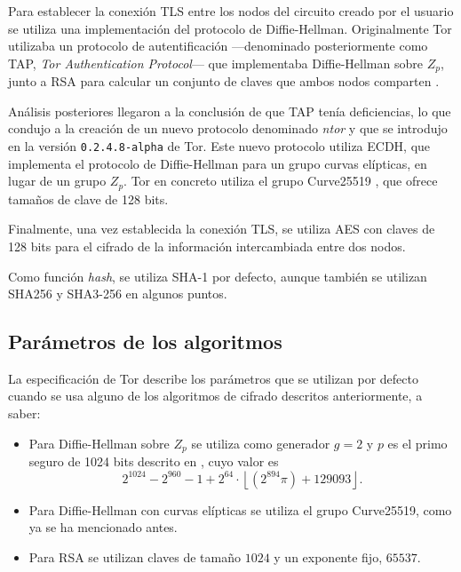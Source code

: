 \documentclass[
  a4paper,
  12pt,
  spanish,
]{scrartcl}
\begin{document}
Para establecer la conexión TLS entre los nodos del circuito creado por el usuario se utiliza una implementación del protocolo de Diffie-Hellman.
Originalmente Tor utilizaba un protocolo de autentificación ---denominado posteriormente como TAP, \textit{Tor Authentication Protocol}--- que implementaba Diffie-Hellman sobre \(Z_p\), junto a RSA para calcular un conjunto de claves que ambos nodos comparten \parencite{dingledine_tor:_2004}.

Análisis posteriores \parencite{hutchison_security_2006} llegaron a la conclusión de que TAP tenía deficiencias, lo que condujo a la creación de un nuevo protocolo denominado \textit{ntor} y que se introdujo en la versión \texttt{0.2.4.8-alpha} de Tor.
Este nuevo protocolo utiliza ECDH, que implementa el protocolo  de Diffie-Hellman para un grupo curvas elípticas, en lugar de un grupo \(Z_p\). Tor en concreto utiliza el grupo Curve25519 \parencite{yung_curve25519:_2006}, que ofrece tamaños de clave de 128 bits.

Finalmente, una vez establecida la conexión TLS, se utiliza AES con claves de 128 bits para el cifrado de la información intercambiada entre dos nodos.

Como función \textit{hash}, se utiliza SHA-1 por defecto, aunque también se utilizan SHA256 y SHA3-256 en algunos puntos.

\subsection{Parámetros de los algoritmos}

La especificación de Tor describe los parámetros que se utilizan por defecto cuando se usa alguno de los algoritmos de cifrado descritos anteriormente, a saber: \begin{itemize}
  \item Para Diffie-Hellman sobre \(Z_p\) se utiliza como generador \(g=2\) y \(p\) es el primo seguro de 1024 bits descrito en \parencite{carrel_internet_1998}, cuyo valor es \[
    2^{1024} - 2^{960} - 1 + 2^{64} \cdot \left\lfloor (2^{894} \pi) + 129093 \right\rfloor.
  \]
  \item Para Diffie-Hellman con curvas elípticas se utiliza el grupo Curve25519, como ya se ha mencionado antes.
  \item Para RSA se utilizan claves de tamaño \(1024\) y un exponente fijo, \(65537\).
\end{itemize}
\end{document}
